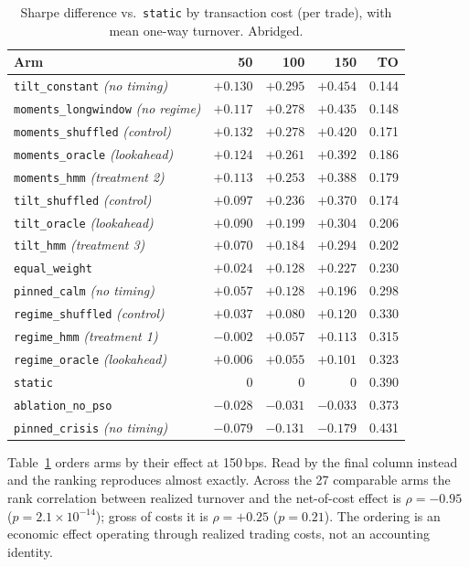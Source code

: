 \documentclass[sigconf,anonymous,review]{acmart}
\begin{document}
\begin{table}[t]
\caption{Sharpe difference vs.\ \texttt{static} by transaction cost (per trade),
with mean one-way turnover. Abridged.}
\label{tab:arms}
\small
\begin{tabular}{lrrrr}
\toprule
Arm & 50 & 100 & 150 & TO \\
\midrule
\texttt{tilt\_constant} \emph{(no timing)}   & $+0.130$ & $+0.295$ & $+0.454$ & 0.144 \\
\texttt{moments\_longwindow} \emph{(no regime)} & $+0.117$ & $+0.278$ & $+0.435$ & 0.148 \\
\texttt{moments\_shuffled} \emph{(control)}  & $+0.132$ & $+0.278$ & $+0.420$ & 0.171 \\
\texttt{moments\_oracle} \emph{(lookahead)}  & $+0.124$ & $+0.261$ & $+0.392$ & 0.186 \\
\texttt{moments\_hmm} \emph{(treatment 2)}   & $+0.113$ & $+0.253$ & $+0.388$ & 0.179 \\
\texttt{tilt\_shuffled} \emph{(control)}     & $+0.097$ & $+0.236$ & $+0.370$ & 0.174 \\
\texttt{tilt\_oracle} \emph{(lookahead)}     & $+0.090$ & $+0.199$ & $+0.304$ & 0.206 \\
\texttt{tilt\_hmm} \emph{(treatment 3)}      & $+0.070$ & $+0.184$ & $+0.294$ & 0.202 \\
\texttt{equal\_weight}                       & $+0.024$ & $+0.128$ & $+0.227$ & 0.230 \\
\texttt{pinned\_calm} \emph{(no timing)}     & $+0.057$ & $+0.128$ & $+0.196$ & 0.298 \\
\texttt{regime\_shuffled} \emph{(control)}   & $+0.037$ & $+0.080$ & $+0.120$ & 0.330 \\
\texttt{regime\_hmm} \emph{(treatment 1)}    & $-0.002$ & $+0.057$ & $+0.113$ & 0.315 \\
\texttt{regime\_oracle} \emph{(lookahead)}   & $+0.006$ & $+0.055$ & $+0.101$ & 0.323 \\
\texttt{static}                              & $0$ & $0$ & $0$ & 0.390 \\
\texttt{ablation\_no\_pso}                   & $-0.028$ & $-0.031$ & $-0.033$ & 0.373 \\
\texttt{pinned\_crisis} \emph{(no timing)}   & $-0.079$ & $-0.131$ & $-0.179$ & 0.431 \\
\bottomrule
\end{tabular}
\end{table}

Table~\ref{tab:arms} orders arms by their effect at 150\,bps. Read by the final
column instead and the ranking reproduces almost exactly. Across the 27 comparable
arms the rank correlation between realized turnover and the net-of-cost effect is
$\rho = -0.95$ ($p = 2.1\times10^{-14}$); gross of costs it is $\rho = +0.25$
($p = 0.21$). The ordering is an economic effect operating through realized trading
costs, not an accounting identity.
\end{document}
